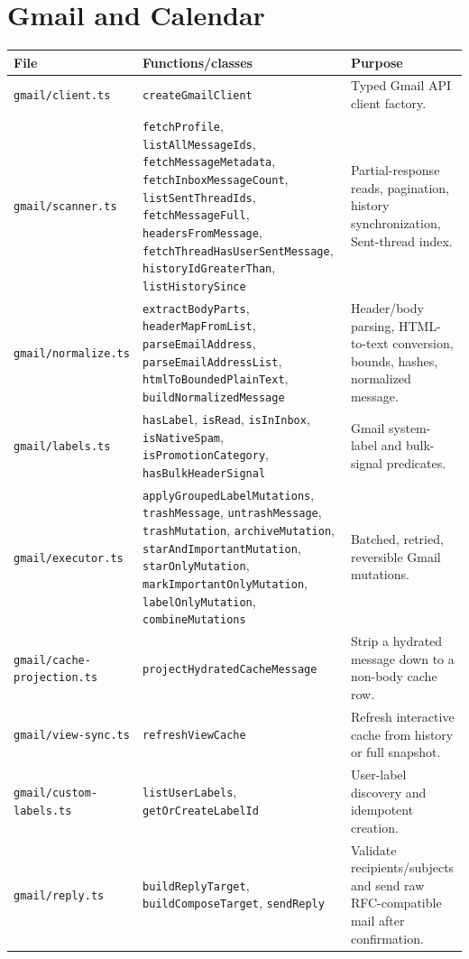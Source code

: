 \documentclass[12pt,oneside]{book}
\newcommand{\code}[1]{\nolinkurl{#1}}
\newcommand{\file}[1]{\nolinkurl{#1}}
\begin{document}
\section{Gmail and Calendar}

\begingroup\scriptsize
\begin{longtable}{P{3.6cm}P{5.8cm}P{7.0cm}}
\toprule
\textbf{File} & \textbf{Functions/classes} & \textbf{Purpose} \\
\midrule
\endhead
\file{gmail/client.ts} & \code{createGmailClient} & Typed Gmail API client factory. \\
\file{gmail/scanner.ts} & \code{fetchProfile}, \code{listAllMessageIds}, \code{fetchMessageMetadata}, \code{fetchInboxMessageCount}, \code{listSentThreadIds}, \code{fetchMessageFull}, \code{headersFromMessage}, \code{fetchThreadHasUserSentMessage}, \code{historyIdGreaterThan}, \code{listHistorySince} & Partial-response reads, pagination, history synchronization, Sent-thread index. \\
\file{gmail/normalize.ts} & \code{extractBodyParts}, \code{headerMapFromList}, \code{parseEmailAddress}, \code{parseEmailAddressList}, \code{htmlToBoundedPlainText}, \code{buildNormalizedMessage} & Header/body parsing, HTML-to-text conversion, bounds, hashes, normalized message. \\
\file{gmail/labels.ts} & \code{hasLabel}, \code{isRead}, \code{isInInbox}, \code{isNativeSpam}, \code{isPromotionCategory}, \code{hasBulkHeaderSignal} & Gmail system-label and bulk-signal predicates. \\
\file{gmail/executor.ts} & \code{applyGroupedLabelMutations}, \code{trashMessage}, \code{untrashMessage}, \code{trashMutation}, \code{archiveMutation}, \code{starAndImportantMutation}, \code{starOnlyMutation}, \code{markImportantOnlyMutation}, \code{labelOnlyMutation}, \code{combineMutations} & Batched, retried, reversible Gmail mutations. \\
\file{gmail/cache-projection.ts} & \code{projectHydratedCacheMessage} & Strip a hydrated message down to a non-body cache row. \\
\file{gmail/view-sync.ts} & \code{refreshViewCache} & Refresh interactive cache from history or full snapshot. \\
\file{gmail/custom-labels.ts} & \code{listUserLabels}, \code{getOrCreateLabelId} & User-label discovery and idempotent creation. \\
\file{gmail/reply.ts} & \code{buildReplyTarget}, \code{buildComposeTarget}, \code{sendReply} & Validate recipients/subjects and send raw RFC-compatible mail after confirmation. \\

\end{longtable}
\end{document}
